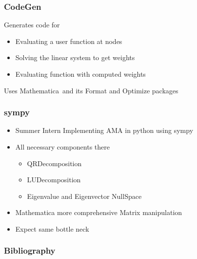 \documentclass[handout]{beamer}
\newcommand{\mma}{Mathematica}
\begin{document}
\begin{frame}
  \frametitle{CodeGen}
Generates code for 

  \begin{itemize}
  \item Evaluating a user function at nodes
  \item Solving the linear system to get weights
  \item Evaluating function with computed weights
  \end{itemize}

 Uses \mma\   and  its Format and Optimize packages

\end{frame}





\begin{frame}
  \frametitle{sympy}
  
  \begin{itemize}
  \item Summer Intern Implementing AMA in python using sympy
  \item All necessary components there
    \begin{itemize}
    \item QRDecomposition
    \item LUDecomposition
    \item Eigenvalue and Eigenvector  NullSpace
    \end{itemize}
  \item Mathematica more comprehensive Matrix manipulation
  \item Expect same bottle neck
  \end{itemize}
\end{frame}




\begin{frame}
  \frametitle{Bibliography}
  


\end{frame}


\end{document}
